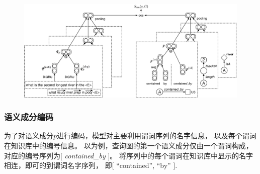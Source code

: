 \begin{figure}[ht]
	\centering
    \includegraphics[width=1.0\columnwidth]{figure/compqa/overview.eps}
	\label{fig:compqa-nn}
\end{figure}




\subsubsection{语义成分编码}
\label{sec:compqa-schema-encoding}




为了对语义成分$p$进行编码，模型对主要利用谓词序列的名字信息，
以及每个谓词在知识库中的编号信息。
以为例，查询图的第一个语义成分仅由一个谓词构成，
对应的编号序列为[ \textit{contained\_by} ]。
将序列中的每个谓词在知识库中显示的名字相连，即可的到谓词名字序列，
即[ ``contained'', ``by'' ].


